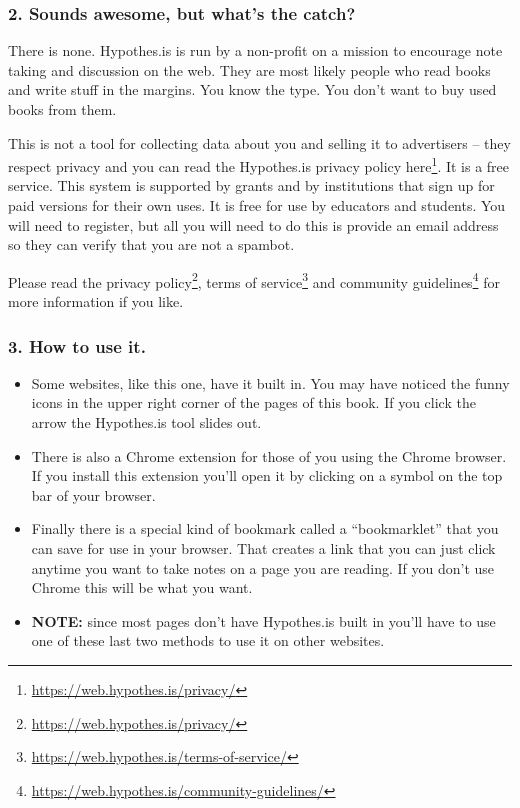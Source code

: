 \documentclass[
  12pt, openany]{book}
\renewcommand{\href}[2]{#2\footnote{\url{#1}}}
\begin{document}
\hypertarget{sounds-awesome-but-whats-the-catch}{%
\subsubsection*{2. Sounds awesome, but what's the catch?}\label{sounds-awesome-but-whats-the-catch}}


There is none. Hypothes.is is run by a non-profit on a mission to encourage note taking and discussion on the web. They are most likely people who read books and write stuff in the margins. You know the type. You don't want to buy used books from them.

This is not a tool for collecting data about you and selling it to advertisers -- they respect privacy and you can read \href{https://web.hypothes.is/privacy/}{the Hypothes.is privacy policy here}. It is a free service. This system is supported by grants and by institutions that sign up for paid versions for their own uses. It is free for use by educators and students. You will need to register, but all you will need to do this is provide an email address so they can verify that you are not a spambot.

Please read the \href{https://web.hypothes.is/privacy/}{privacy policy}, \href{https://web.hypothes.is/terms-of-service/}{terms of service} and \href{https://web.hypothes.is/community-guidelines/}{community guidelines} for more information if you like.

\hypertarget{how-to-use-it.}{%
\subsubsection*{3. How to use it.}\label{how-to-use-it.}}


\begin{itemize}
\item
  Some websites, like this one, have it built in. You may have noticed the funny icons in the upper right corner of the pages of this book. If you click the arrow the Hypothes.is tool slides out.
\item
  There is also a Chrome extension for those of you using the Chrome browser. If you install this extension you'll open it by clicking on a symbol on the top bar of your browser.
\item
  Finally there is a special kind of bookmark called a ``bookmarklet'' that you can save for use in your browser. That creates a link that you can just click anytime you want to take notes on a page you are reading. If you don't use Chrome this will be what you want.
\item
  \textbf{NOTE:} since most pages don't have Hypothes.is built in you'll have to use one of these last two methods to use it on other websites.
\end{itemize}
\end{document}
